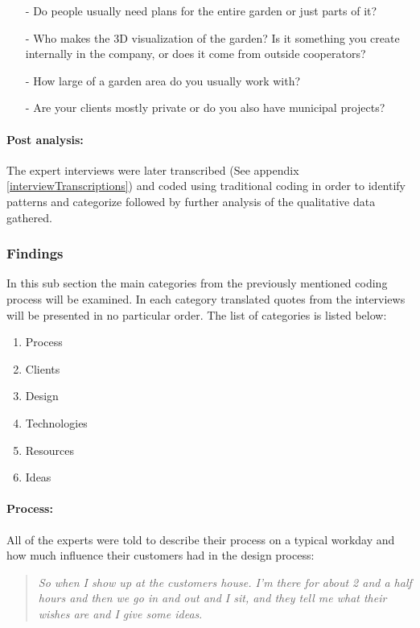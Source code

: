 	\begin{itemize}
		\item[-] Do people usually need plans for the entire garden or just parts of it?
		\item[-] Who makes the 3D visualization of the garden? Is it something you create internally in the company, or does it come from outside cooperators? 
		\item[-] How large of a garden area do you usually work with?
		\item[-] Are your clients mostly private or do you also have municipal projects?
	\end{itemize}
	
	\paragraph*{Post analysis:}The expert interviews were later transcribed (See appendix \ref{interviewTranscriptions}) and coded using traditional coding in order to identify patterns and categorize followed by further analysis of the qualitative data gathered.
		
		\subsubsection{Findings}
		In this sub section the main categories from the previously mentioned coding process will be examined. In each category translated quotes from the interviews will be presented in no particular order. The list of categories is listed below:
		
		\begin{enumerate}
			\item Process
			\item Clients
			\item Design
			\item Technologies
			\item Resources
			\item Ideas
		\end{enumerate}
		
		\paragraph*{Process:}
		All of the experts were told to describe their process on a typical workday and how  much influence their customers had in the design process:\\
		\begin{quote}
			\textit{So when I show up at the customers house. I'm there for about 2 and a half hours and then we go in and out and I sit, and they tell me what their wishes are and I give some ideas}\label{quote:expertProcess1}.\\
		\end{quote}
		
